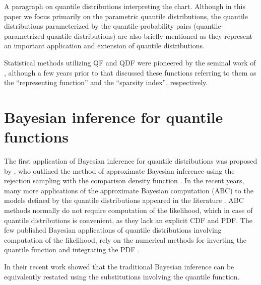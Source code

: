 \documentclass[
  12pt,
]{article}
\begin{document}
A paragraph on quantile distributions interpreting the chart. Although in this paper we focus primarily on the parametric quantile distributions, the quantile distributions parameterized by the quantile-probability pairs (quantile-parametrized quantile distributions) are also briefly mentioned as they represent an important application and extension of quantile distributions.

Statistical methods utilizing QF and QDF were pioneered by the seminal work of \citet{parzen1979NonparametricStatisticalData}, although a few years prior to that \citet{tukey1965WhichPartSample} discussed these functions referring to them as the ``representing function'' and the ``sparsity index'', respectively.

\hypertarget{bayesian-inference-for-quantile-functions}{%
\section{Bayesian inference for quantile functions}\label{bayesian-inference-for-quantile-functions}}

The first application of Bayesian inference for quantile distributions was proposed by \citet{parzen2004QuantileProbabilityStatistical}, who outlined the method of approximate Bayesian inference using the rejection sampling with the comparison density function \citep[see sections 21-24 in][]{parzen2004QuantileProbabilityStatistical}. In the recent years, many more applications of the approximate Bayesian computation (ABC) to the models defined by the quantile distributions appeared in the literature \citetext{\citealp{allingham2009BayesianEstimationQuantile}; \citealp{drovandi2011LikelihoodfreeBayesianEstimation}; \citealp{dunson2005ApproximateBayesianInference}; \citealp{mcvinish2012ImprovingABCQuantile}; \citealp[and][]{smithson2017CDFquantileDistributionsModellinga}}. ABC methods normally do not require computation of the likelihood, which in case of quantile distributions is convenient, as they lack an explicit CDF and PDF. The few published Bayesian applications of quantile distributions involving computation of the likelihood, rely on the numerical methods for inverting the quantile function and integrating the PDF \citep{prangle2017GkPackageGandk, bernton2019ApproximateBayesianComputation}.

In their recent work \citet{nair2020BayesianInferenceQuantile} showed that the traditional Bayesian inference can be equivalently restated using the substitutions involving the quantile function.
\end{document}
